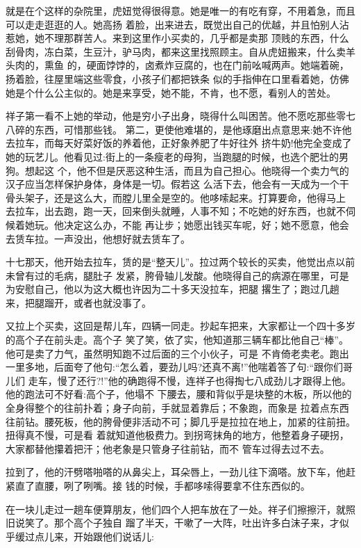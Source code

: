 \documentclass[11pt,a4paper,onecolumn]{article}
\begin{document}
就是在个这样的杂院里，虎妞觉得很得意。她是唯一的有吃有穿，不用着急，而且可以走走逛逛的人。她高扬
着脸，出来进去，既觉出自己的优越，并且怕别人沾惹她，她不理那群苦人。来到这里作小买卖的，几乎都是卖那
顶贱的东西，什么刮骨肉，冻白菜，生豆汁，驴马肉，都来这里找照顾主。自从虎妞搬来，什么卖羊头肉的，熏鱼
的，硬面饽饽的，卤煮炸豆腐的，也在门前吆喊两声。她端着碗，扬着脸，往屋里端这些零食，小孩子们都把铁条
似的手指伸在口里看着她，仿佛她是个什么公主似的。她是来享受，她不能，不肯，也不愿，看别人的苦处。

祥子第一看不上她的举动，他是穷小子出身，晓得什么叫困苦。他不愿吃那些零七八碎的东西，可惜那些钱。
第二，更使他难堪的，是他琢磨出点意思来:她不许他去拉车，而每天好菜好饭的养着他，正好象养肥了牛好往外
挤牛奶!他完全变成了她的玩艺儿。他看见过:街上的一条瘦老的母狗，当跑腿的时候，也选个肥壮的男狗。想起这
个，他不但是厌恶这种生活，而且为自己担心。他晓得一个卖力气的汉子应当怎样保护身体，身体是一切。假若这
么活下去，他会有一天成为一个干骨头架子，还是这么大，而膛儿里全是空的。他哆嗦起来。打算要命，他得马上
去拉车，出去跑，跑一天，回来倒头就睡，人事不知；不吃她的好东西，也就不伺候着她玩。他决定这么办，不能
再让步；她愿出钱买车呢，好；她不愿意，他会去赁车拉。一声没出，他想好就去赁车了。

十七那天，他开始去拉车，赁的是``整天儿''。拉过两个较长的买卖，他觉出点以前未曾有过的毛病，腿肚子
发紧，胯骨轴儿发酸。他晓得自己的病源在哪里，可是为安慰自己，他以为这大概也许因为二十多天没拉车，把腿
撂生了；跑过几趟来，把腿蹓开，或者也就没事了。

又拉上个买卖，这回是帮儿车，四辆一同走。抄起车把来，大家都让一个四十多岁的高个子在前头走。高个子
笑了笑，依了实，他知道那三辆车都比他自己``棒''。他可是卖了力气，虽然明知跑不过后面的三个小伙子，可是
不肯倚老卖老。跑出一里多地，后面夸了他句:``怎么着，要劲儿吗?还真不离!''他喘着答了句:``跟你们哥儿们
走车，慢了还行?!''他的确跑得不慢，连祥子也得掏七八成劲儿才跟得上他。他的跑法可不好看:高个子，他塌不
下腰去，腰和背似乎是块整的木板，所以他的全身得整个的往前扑着；身子向前，手就显着靠后；不象跑，而象是
拉着点东西往前钻。腰死板，他的胯骨便非活动不可；脚几乎是拉拉在地上，加紧的往前扭。扭得真不慢，可是看
着就知道他极费力。到拐弯抹角的地方，他整着身子硬拐，大家都替他攥着把汗；他老象是只管身子往前钻，而不
管车过得去过不去。

拉到了，他的汗劈嗒啪嗒的从鼻尖上，耳朵唇上，一劲儿往下滴嗒。放下车，他赶紧直了直腰，咧了咧嘴。接
钱的时候，手都哆嗦得要拿不住东西似的。

在一块儿走过一趟车便算朋友，他们四个人把车放在了一处。祥子们擦擦汗，就照旧说笑了。那个高个子独自
蹓了半天，干嗽了一大阵，吐出许多白沫子来，才似乎缓过点儿来，开始跟他们说话儿:
\end{document}
